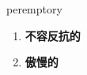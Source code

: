 
\begin{frame}
{\huge peremptory}
\begin{center}
\begin{enumerate}\Large
  \item \textbf{不容反抗的}
  \item \textbf{傲慢的}
\end{enumerate}
\end{center}
\end{frame}
